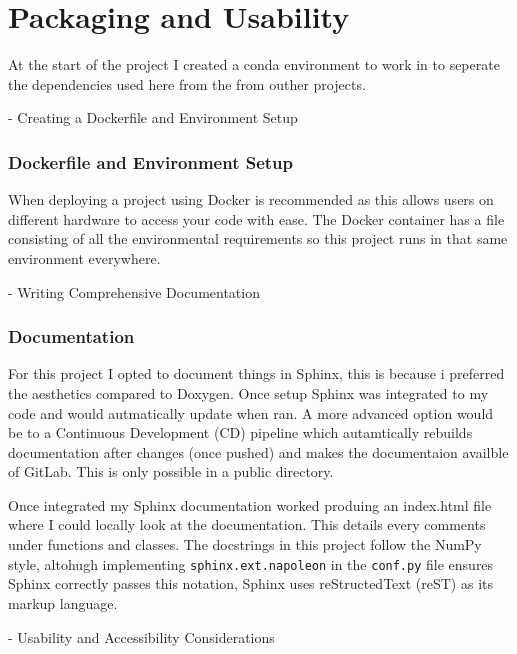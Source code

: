 \documentclass{report}
\def\code#1{\texttt{#1}}
\begin{document}
\section{Packaging and Usability}

At the start of the project I created a conda environment to work in to seperate the dependencies used here from the from outher projects.

- Creating a Dockerfile and Environment Setup
\subsubsection*{Dockerfile and Environment Setup}
When deploying a project using Docker is recommended as this allows users on different hardware to access your code with ease. The Docker container has a file consisting of all the environmental requirements so this project runs in that same environment everywhere.

- Writing Comprehensive Documentation
\subsubsection*{Documentation}
For this project I opted to document things in Sphinx, this is because i preferred the aesthetics compared to Doxygen. Once setup Sphinx was integrated to my code and would autmatically update when ran. A more advanced option would be to a Continuous Development (CD) pipeline which autamtically rebuilds documentation after changes (once pushed) and makes the documentaion availble of GitLab. This is only possible in a public directory.

Once integrated my Sphinx documentation worked produing an index.html file where I could locally look at the documentation. This details every comments under functions and classes. The docstrings in this project follow the NumPy style, altohugh implementing \code{sphinx.ext.napoleon} in the \code{conf.py} file ensures Sphinx correctly passes this notation, Sphinx uses reStructedText (reST) as its markup language.

- Usability and Accessibility Considerations
\end{document}
